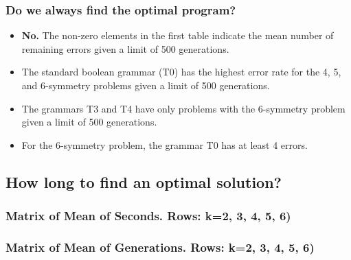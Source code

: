 \documentclass[18pt,c]{beamer}
\makeatletter
\let\beamer@writeslidentry@miniframeson=\beamer@writeslidentry
\newcommand*{\miniframeson}{\let\beamer@writeslidentry=\beamer@writeslidentry@miniframeson}
\makeatother
\begin{document}
\begin{frame}
\frametitle{
Do we always find the optimal program?
}
\begin{itemize}
\item {\bf No.} The non-zero elements in the first table
         indicate the mean number of remaining errors given
         a limit of 500 generations.
\item The standard boolean grammar (T0) has the highest error rate
  for the 4, 5, and 6-symmetry problems given a limit of 500 generations.
\item The grammars T3 and T4 have only problems with the 6-symmetry problem
       given a limit of 500 generations.
\item For the 6-symmetry problem, the grammar T0 has at least 4 errors.
\end{itemize}
\end{frame}%
\miniframeson
\subsection{How long to find an optimal solution?}
 \begin{frame}
 \fontsize{8pt}{9pt}\selectfont
 \frametitle{ Matrix of Mean of Seconds.  Rows: k=2, 3, 4, 5, 6) }

 \label{ExpBMeanMatrixTable002.tex}  
 \end{frame}

 \begin{frame}
 \fontsize{8pt}{9pt}\selectfont
 \frametitle{ Matrix of Mean of Generations.  Rows: k=2, 3, 4, 5, 6) }

 \label{ExpBMeanMatrixTable003.tex}  
 \end{frame}
\end{document}
